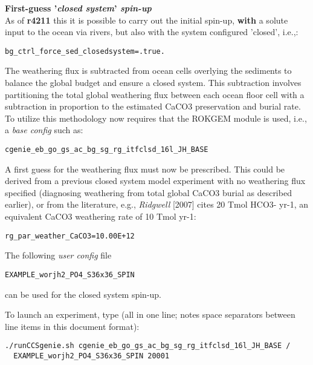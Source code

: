 \documentclass[10pt,twoside]{article}
\begin{document}
\begin{compactenum}

	\item \textbf{First-guess '\textit{closed system}' \textit{spin-up}}
	\\As of \textbf{r4211} this it is possible to carry out the initial spin-up, \textbf{with} a solute input to the ocean via rivers, but also with the system configured 'closed', i.e.,:
\vspace{-5pt}\begin{verbatim}bg_ctrl_force_sed_closedsystem=.true.\end{verbatim}\vspace{-5pt}
The weathering flux is subtracted from ocean cells overlying the sediments to balance the global budget and ensure a closed system. This subtraction involves partitioning the total global weathering flux between each ocean floor cell with a subtraction in proportion to the estimated CaCO3 preservation and burial rate. To utilize this methodology now requires that the ROKGEM module is used, i.e., a \textit{base config} such as:
\vspace{-5pt}\begin{verbatim}cgenie_eb_go_gs_ac_bg_sg_rg_itfclsd_16l_JH_BASE\end{verbatim}\vspace{-5pt}
A first guess for the weathering flux must now be prescribed. This could be derived from a previous closed system model experiment with no weathering flux specified (diagnosing weathering from total global CaCO3 burial as described earlier), or from the literature, e.g., \textit{Ridgwell} [2007] cites 20 Tmol HCO3- yr-1, an equivalent CaCO3 weathering rate of 10 Tmol yr-1:
\vspace{-5pt}\begin{verbatim}rg_par_weather_CaCO3=10.00E+12\end{verbatim}\vspace{-5pt}

The following \textit{user config} file 
\vspace{-5pt}\begin{verbatim}EXAMPLE_worjh2_PO4_S36x36_SPIN\end{verbatim}\vspace{-5pt}
can be used for the closed system spin-up.

\noindent To launch an experiment, type (all in one line; notes space separators between line items in this document format):
\vspace{-5pt}\begin{verbatim}
./runCCSgenie.sh cgenie_eb_go_gs_ac_bg_sg_rg_itfclsd_16l_JH_BASE /
  EXAMPLE_worjh2_PO4_S36x36_SPIN 20001
\end{verbatim}\vspace{-5pt}


\end{compactenum}
\end{document}
